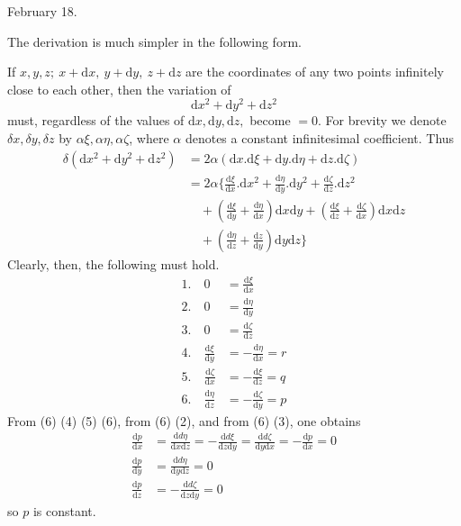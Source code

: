  February 18.

The derivation is much simpler in the following form.

If $x,y,z;\ x+\mathrm dx,\ y+\mathrm dy,\ z+\mathrm dz$ are the coordinates of any two points infinitely close to each other, then the variation of
\[
\mathrm dx^2+\mathrm dy^2+\mathrm dz^2
\]
must, regardless of the values of $\mathrm dx,\mathrm dy,\mathrm dz,$ become $=0$. For brevity we denote $\delta x,\delta y,\delta z$ by $\alpha\xi,\alpha\eta,\alpha\zeta$, where $\alpha$ denotes a constant infinitesimal coefficient. Thus
\[
\begin{aligned}
\delta(\mathrm dx^2+\mathrm dy^2+\mathrm dz^2)&=2\alpha(\mathrm dx.\mathrm d\xi+\mathrm dy.\mathrm d\eta+\mathrm dz.\mathrm d\zeta)\\
&=2\alpha\Big\{\frac{\mathrm d\xi}{\mathrm dx}.\mathrm dx^2+\frac{\mathrm d\eta}{\mathrm dy}.\mathrm dy^2+\frac{\mathrm d\zeta}{\mathrm dz}.\mathrm dz^2\\
&\quad+\left(\frac{\mathrm d\xi}{\mathrm dy}+\frac{\mathrm d\eta}{\mathrm dx}\right)\mathrm dx\mathrm dy+\left(\frac{\mathrm d\xi}{\mathrm dz}+\frac{\mathrm d\zeta}{\mathrm dx}\right)\mathrm dx\mathrm dz\\
&\quad+\left(\frac{\mathrm d\eta}{\mathrm dz}+\frac{\mathrm dz}{\mathrm dy}\right)\mathrm dy\mathrm dz\Big\}
\end{aligned}
\]
Clearly, then, the following must hold.
\[
\begin{aligned}
1.\quad0&=\frac{\mathrm d\xi}{\mathrm dx}\\
2.\quad0&=\frac{\mathrm d\eta}{\mathrm dy}\\
3.\quad0&=\frac{\mathrm d\zeta}{\mathrm dz}\\
4.\quad\frac{\mathrm d\xi}{\mathrm dy}&=-\frac{\mathrm d\eta}{\mathrm dx}=r\\
5.\quad\frac{\mathrm d\zeta}{\mathrm dx}&=-\frac{\mathrm d\xi}{\mathrm dz}=q\\
6.\quad\frac{\mathrm d\eta}{\mathrm dz}&=-\frac{\mathrm d\zeta}{\mathrm dy}=p
\end{aligned}
\]
From (6) (4) (5) (6), from (6) (2), and from (6) (3), one obtains
\[
\begin{aligned}
\frac{\mathrm dp}{\mathrm dx}&=\frac{\mathrm dd\eta}{\mathrm dx\mathrm dz}=-\frac{\mathrm dd\xi}{\mathrm dz\mathrm dy}=\frac{\mathrm dd\zeta}{\mathrm dy\mathrm dx}=-\frac{\mathrm dp}{\mathrm dx}=0\\
\frac{\mathrm dp}{\mathrm dy}&=\frac{\mathrm dd\eta}{\mathrm dy\mathrm dz}=0\\
\frac{\mathrm dp}{\mathrm dz}&=-\frac{\mathrm dd\zeta}{\mathrm dz\mathrm dy}=0
\end{aligned}
\]
so $p$ is constant.

